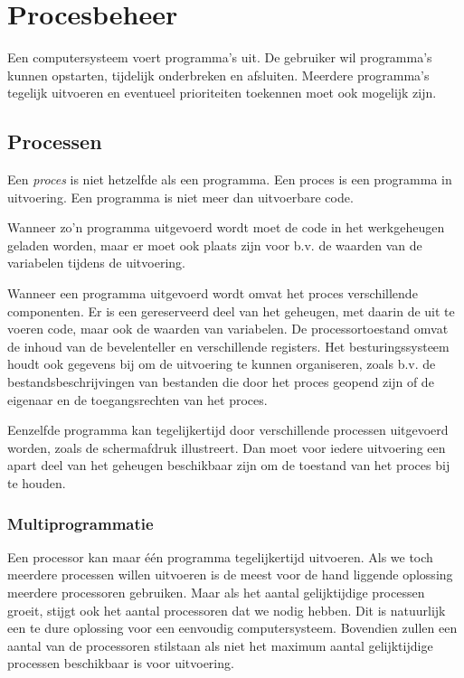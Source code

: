 \chapter{Procesbeheer}

Een computersysteem voert programma's uit. De gebruiker wil
programma's kunnen opstarten, tijdelijk onderbreken en afsluiten. Meerdere
programma's tegelijk uitvoeren en eventueel prioriteiten toekennen moet
ook mogelijk zijn.

\section{Processen}

Een \emph{proces} is niet hetzelfde als een
programma. Een proces is een programma in uitvoering. Een programma is
niet meer dan uitvoerbare code.

Wanneer zo'n programma uitgevoerd wordt moet de code in het
werkgeheugen geladen worden, maar er moet ook plaats zijn voor b.v. de
waarden van de variabelen tijdens de uitvoering.

Wanneer een programma uitgevoerd wordt omvat het proces
verschillende componenten. Er is een gereserveerd deel van het geheugen,
met daarin de uit te voeren code, maar ook de waarden van variabelen. De
processortoestand omvat de inhoud van de bevelenteller en verschillende
registers. Het besturingssysteem houdt ook gegevens bij om de uitvoering
te kunnen organiseren, zoals b.v. de bestandsbeschrijvingen van
bestanden die door het proces geopend zijn of de eigenaar en de
toegangsrechten van het proces.

Eenzelfde programma kan tegelijkertijd door verschillende
processen uitgevoerd worden, zoals de schermafdruk illustreert. Dan moet
voor iedere uitvoering een apart deel van het geheugen beschikbaar zijn
om de toestand van het proces bij te houden.

\subsection{Multiprogrammatie}

Een processor kan maar \'e\'en programma tegelijkertijd uitvoeren.
Als we toch meerdere processen willen uitvoeren is de meest voor de
hand liggende oplossing meerdere processoren gebruiken. Maar als het
aantal gelijktijdige processen groeit, stijgt ook het aantal
processoren dat we nodig hebben. Dit is natuurlijk een te dure
oplossing voor een eenvoudig computersysteem. Bovendien zullen een
aantal van de processoren stilstaan als niet het maximum aantal
gelijktijdige processen beschikbaar is voor uitvoering.

